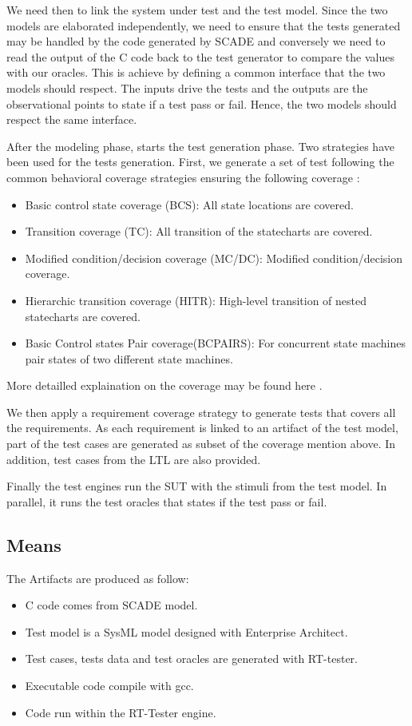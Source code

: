 We need then to link the system under test and the test model. Since
the two models are elaborated independently, we need to ensure that
the tests generated may be handled by the code generated by SCADE and
conversely we need to read the output of the C code back to the test
generator to compare the values with our oracles. This is achieve by
defining a common interface that the two models should respect. The
inputs drive the tests and the outputs are the observational points to
state if a test pass or fail. Hence, the two models should respect the
same interface.

After the modeling phase, starts the test generation phase.
Two strategies have been used for the tests generation. First, we
generate a set of test following the common behavioral coverage
strategies ensuring the following coverage :
\begin{itemize}
\item  Basic control state coverage (BCS): All state locations are covered.
\item  Transition coverage (TC): All transition of the statecharts are covered.
\item  Modified condition/decision coverage (MC/DC): Modified condition/decision coverage.
\item  Hierarchic transition coverage (HITR): High-level transition of
  nested statecharts are covered.
\item  Basic Control states Pair coverage(BCPAIRS): For concurrent state
  machines pair states of two different state machines. 
\end{itemize}

More detailled explaination on the coverage may be found here \cite{huang_test_2013}.

We then apply a requirement coverage strategy to
generate tests that covers all the requirements. 
As each requirement
is linked to an artifact of the test model, part of the test cases
are generated as subset of the coverage mention above. In addition,
test cases from the LTL are also provided.


Finally the test engines run the SUT with the stimuli from the test
model. In parallel, it runs the test oracles that states if the test
pass or fail.

\subsection{Means}

The Artifacts are produced as follow:
\begin{itemize}
\item C code comes from SCADE model.
\item Test model is a SysML model designed with Enterprise Architect.
\item Test cases, tests data and test oracles are generated with RT-tester.
\item Executable code compile with gcc.
\item Code run within the RT-Tester engine.
\end{itemize}


